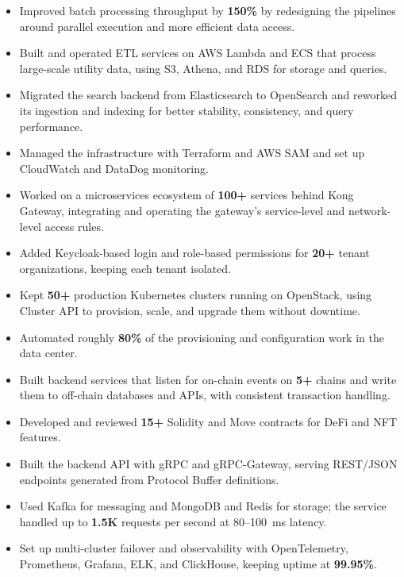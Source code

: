 \begin{itemize}
    \item Improved batch processing throughput by \textbf{150\%} by redesigning the pipelines around parallel execution and more efficient data access. %
    \item Built and operated ETL services on AWS Lambda and ECS that process large-scale utility data, using S3, Athena, and RDS for storage and queries. %
    \item Migrated the search backend from Elasticsearch to OpenSearch and reworked its ingestion and indexing for better stability, consistency, and query performance. %
    \item Managed the infrastructure with Terraform and AWS SAM and set up CloudWatch and DataDog monitoring. %
\end{itemize}

\jobVNPAY
\begin{itemize}
    \item Worked on a microservices ecosystem of \textbf{100+} services behind Kong Gateway, integrating and operating the gateway's service-level and network-level access rules. %
    \item Added Keycloak-based login and role-based permissions for \textbf{20+} tenant organizations, keeping each tenant isolated. %
    \item Kept \textbf{50+} production Kubernetes clusters running on OpenStack, using Cluster API to provision, scale, and upgrade them without downtime. %
    \item Automated roughly \textbf{80\%} of the provisioning and configuration work in the data center. %
\end{itemize}

\jobEsolLabs
\begin{itemize}
    \item Built backend services that listen for on-chain events on \textbf{5+} chains and write them to off-chain databases and APIs, with consistent transaction handling. %
    \item Developed and reviewed \textbf{15+} Solidity and Move contracts for DeFi and NFT features. %
\end{itemize}


\projDattingQ
\begin{itemize}
    \item Built the backend API with gRPC and gRPC-Gateway, serving REST/JSON endpoints generated from Protocol Buffer definitions. %
    \item Used Kafka for messaging and MongoDB and Redis for storage; the service handled up to \textbf{1.5K} requests per second at 80--100~ms latency. %
    \item Set up multi-cluster failover and observability with OpenTelemetry, Prometheus, Grafana, ELK, and ClickHouse, keeping uptime at \textbf{99.95\%}. %
\end{itemize}

